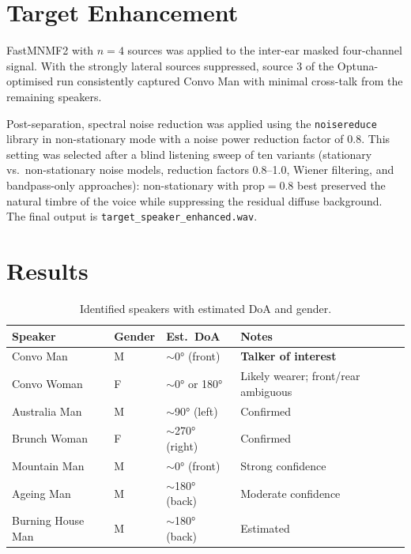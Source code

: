\section{Target Enhancement}

FastMNMF2 with $n{=}4$ sources was applied to the inter-ear masked four-channel signal. With the strongly lateral sources suppressed, source 3 of the Optuna-optimised run consistently captured Convo Man with minimal cross-talk from the remaining speakers.

Post-separation, spectral noise reduction was applied using the \texttt{noisereduce} library in non-stationary mode with a noise power reduction factor of 0.8. This setting was selected after a blind listening sweep of ten variants (stationary vs.\ non-stationary noise models, reduction factors 0.8–1.0, Wiener filtering, and bandpass-only approaches): non-stationary with $\text{prop}=0.8$ best preserved the natural timbre of the voice while suppressing the residual diffuse background. The final output is \texttt{target\_speaker\_enhanced.wav}.

\section{Results}

\begin{table}[H]
\centering
\caption{Identified speakers with estimated DoA and gender.}
\label{tab:results}
\begin{tabular}{llll}
\toprule
\textbf{Speaker} & \textbf{Gender} & \textbf{Est.\ DoA} & \textbf{Notes} \\
\midrule
Convo Man         & M & $\sim$0° (front)   & \textbf{Talker of interest} \\
Convo Woman       & F & $\sim$0° or 180°   & Likely wearer; front/rear ambiguous \\
Australia Man     & M & $\sim$90° (left)   & Confirmed \\
Brunch Woman      & F & $\sim$270° (right) & Confirmed \\
Mountain Man      & M & $\sim$0° (front)   & Strong confidence \\
Ageing Man        & M & $\sim$180° (back)  & Moderate confidence \\
Burning House Man & M & $\sim$180° (back)  & Estimated \\
\bottomrule
\end{tabular}
\end{table}


